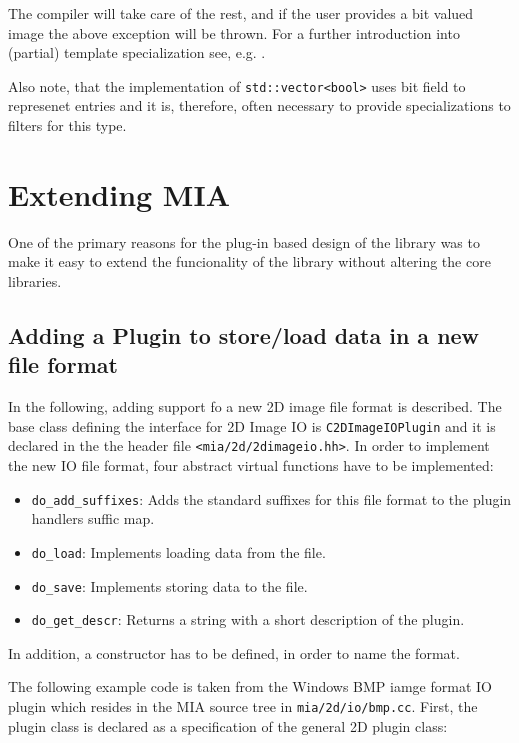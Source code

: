 \documentclass[english, 10pt, a4paper,headsepline,openany]{scrbook}
\begin{document}
The compiler will take care of the rest, and if the user provides a bit valued image the 
  above exception will be thrown. 
For a further introduction into (partial) template specialization see, e.g.  
  \citet{vandevoorde05}.

Also note, that the implementation of \texttt{std::vector<bool>} uses bit field to represenet entries 
  and it is, therefore, often necessary to provide specializations to filters for this type.  


\section{Extending MIA}
\label{ch:extending}

One of the primary reasons for the plug-in based design of the library was to make it easy to extend 
  the funcionality of the library without altering the core libraries.




\subsection{Adding a Plugin to store/load data in a new file format}
\label{sec:newfilehandler}

In the following, adding support fo a new 2D image file format is described. 
The base class defining the interface for 2D Image IO is \texttt{C2DImageIOPlugin} and it is 
  declared in the the header file \texttt{<mia/2d/2dimageio.hh>}. 
In order to implement the new IO file format, four abstract virtual functions have to be implemented: 
\begin{itemize}  
\item {\tt do\_add\_suffixes}: Adds the standard suffixes for this file format to the plugin handlers suffic map. 
\item {\tt do\_load}: Implements loading data from the file. 
\item {\tt do\_save}: Implements storing data to the file. 
\item {\tt do\_get\_descr}: Returns a string with a short description of the plugin.
\end{itemize}  
In addition, a constructor has to be defined, in order to name the format. 

The following example code is taken from the Windows BMP iamge format IO plugin which resides in the MIA source tree in \texttt{mia/2d/io/bmp.cc}.
First, the plugin class is declared as a specification of the general 2D plugin class: 
\end{document}
